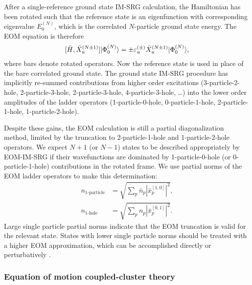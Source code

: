 After a single-reference ground state IM-SRG calculation, the
Hamiltonian has been rotated such that the reference state is an
eigenfunction with corresponding eigenvalue $E^{(N)}_0$, which is the
correlated $N$-particle ground state energy. The EOM equation is
therefore
\begin{align} \label{eq:EOMIMSRG}
  [\bar{H},\bar{X}^{(N \pm 1)}_u] | \Phi^{(N)}_0 \rangle = \pm \varepsilon^{(\pm)}_u \bar{X}^{(N \pm 1)}_u | \Phi^{(N)}_0 \rangle,
\end{align}
where bars denote rotated operators. Now the reference state is used
in place of the bare correlated ground state. The ground state IM-SRG
procedure has implicitly re-summed contributions from higher order
excitations (3-particle-2-hole, 2-particle-3-hole, 2-particle-3-hole,
4-particle-3-hole, \ldots) into the lower order amplitudes of the
ladder operators (1-particle-0-hole, 0-particle-1-hole,
2-particle-1-hole, 1-particle-2-hole).

Despite these gains, the EOM calculation is still a partial
diagonalization method, limited by the truncation to 2-particle-1-hole
and 1-particle-2-hole operators. We expect $N + 1$ (or $N - 1$) states
to be described appropriately by EOM-IM-SRG if their wavefunctions are
dominated by 1-particle-0-hole (or 0-particle-1-hole) contributions in
the rotated frame. We use partial norms of the EOM ladder operators to
make this determination:
\begin{align}
  \label{eq:partial_norms_p}
  n_{\text{1-particle}} &= \sqrt{\sum_p \bar{n}_p | \bar{x}^{[1,0]}_p |^2},\\
  \label{eq:partial_norms_h}
  n_{\text{1-hole}} &= \sqrt{\sum_p n_p | \bar{x}^{[0,1]}_p |^2}.
\end{align}
Large single particle partial norms indicate that the EOM truncation
is valid for the relevant state. States with lower single particle
norms should be treated with a higher EOM approximation, which can
be accomplished directly or perturbatively \cite{PhysRevC.95.044304}.

\subsubsection*{Equation of motion coupled-cluster theory}

